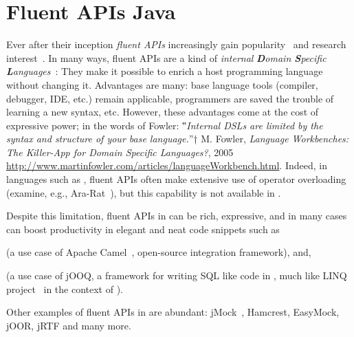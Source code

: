 \section{Fluent APIs Java}
Ever after their inception \emph{fluent APIs}
  increasingly gain popularity~\cite{Hibernate:06,Freeman:Pryce:06,Larsen:2012} and research
  interest~\cite{Deursen:2000,Kabanov:2008}.
In many ways, fluent APIs are a kind of
  \emph{internal} \emph{\textbf Domain \textbf Specific \textbf Languages}~\cite{VanDeursen:Klint:2000,Hudak:1997,Fowler:2010}:
They make it possible to enrich a host programming language without changing it.
Advantages are many: base language tools (compiler, debugger, IDE, etc.) remain
  applicable, programmers are saved the trouble of learning a new syntax, etc.
However, these advantages come at the cost of expressive power;
  in the words of Fowler:
  ‟\emph{Internal DSLs are limited by the syntax and structure of your base language.}”†
  {M. Fowler, \emph{Language Workbenches: The Killer-App for Domain Specific Languages?},
    2005
    \newline
  \url{http://www.martinfowler.com/articles/languageWorkbench.html}}.
Indeed, in languages such as \CC, fluent APIs
  often make extensive use of operator overloading (examine, e.g., \textsf{Ara-Rat}~\cite{Gil:Lenz:07}),
  but this capability is not available in \Java.

Despite this limitation, fluent APIs in \Java can be rich, expressive,
and in many cases can boost productivity in elegant and neat code snippets such as

\begin{quote}
\end{quote}

(a use case of Apache Camel~\cite{Ibsen:Anstey:10}, open-source integration
framework), and,

\begin{quote}
\end{quote}

(a use case of jOOQ, a framework for writing SQL
like code in \Java, much like LINQ project~\cite{Meijer:Beckman:Bierman:06} in
the context of \CSharp).

Other examples of fluent APIs in \Java are abundant:
jMock~\cite{Freeman:Pryce:06},
Hamcrest,
EasyMock,
jOOR,
jRTF
and many more.

